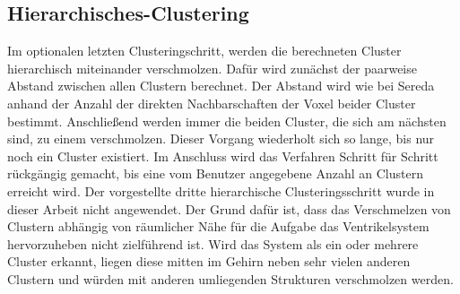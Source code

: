 \subsection{Hierarchisches-Clustering}
 
Im optionalen letzten Clusteringschritt, werden die berechneten Cluster hierarchisch miteinander verschmolzen. Dafür wird zunächst der paarweise Abstand zwischen allen Clustern berechnet. Der Abstand wird wie bei Sereda \cite{sereda2006automating} anhand der Anzahl der direkten Nachbarschaften der Voxel beider Cluster bestimmt. Anschließend werden immer die beiden Cluster, die sich am nächsten sind, zu einem verschmolzen. Dieser Vorgang wiederholt sich so lange, bis nur noch ein Cluster existiert. Im Anschluss wird das Verfahren Schritt für Schritt rückgängig gemacht, bis eine vom Benutzer angegebene Anzahl an Clustern erreicht wird.
\newline
Der vorgestellte dritte hierarchische Clusteringsschritt wurde in dieser Arbeit nicht angewendet. Der Grund dafür ist, dass das Verschmelzen von Clustern abhängig von räumlicher Nähe für die Aufgabe das Ventrikelsystem hervorzuheben nicht zielführend ist. Wird das System als ein oder mehrere Cluster erkannt, liegen diese mitten im Gehirn neben sehr vielen anderen Clustern und würden mit anderen umliegenden Strukturen verschmolzen werden.





















































